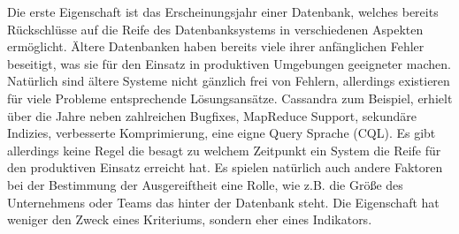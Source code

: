 Die erste Eigenschaft ist das Erscheinungsjahr einer Datenbank, welches bereits Rückschlüsse auf die Reife des Datenbanksystems in verschiedenen Aspekten ermöglicht. Ältere Datenbanken haben bereits viele ihrer anfänglichen Fehler beseitigt, was sie für den Einsatz in produktiven Umgebungen geeigneter machen. Natürlich sind ältere Systeme nicht gänzlich frei von Fehlern, allerdings existieren für viele Probleme entsprechende Lösungsansätze. Cassandra zum Beispiel, erhielt über die Jahre neben zahlreichen Bugfixes, MapReduce Support, sekundäre Indizies, verbesserte Komprimierung, eine eigne Query Sprache (CQL). Es gibt allerdings keine Regel die besagt zu welchem Zeitpunkt ein System die Reife für den produktiven Einsatz erreicht hat. Es spielen natürlich auch andere Faktoren bei der Bestimmung der Ausgereiftheit eine Rolle, wie z.B. die Größe des Unternehmens oder Teams das hinter der Datenbank steht. Die Eigenschaft hat weniger den Zweck eines Kriteriums, sondern eher eines Indikators. 

